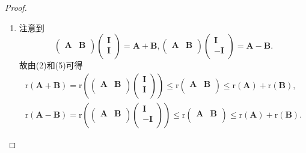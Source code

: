 \documentclass[lang=cn,newtx,10pt,scheme=chinese]{elegantbook}
\begin{document}
\begin{proof}
\begin{enumerate}[(1)]
    \item  注意到
    \[
        \left( \begin{matrix}
            \boldsymbol{A}&		\boldsymbol{B}\\
        \end{matrix} \right) \left( \begin{array}{c}
            \boldsymbol{I}\\
            \boldsymbol{I}\\
        \end{array} \right) =\boldsymbol{A}+\boldsymbol{B},\left( \begin{matrix}
            \boldsymbol{A}&		\boldsymbol{B}\\
        \end{matrix} \right) \left( \begin{array}{c}
            \boldsymbol{I}\\
            -\boldsymbol{I}\\
        \end{array} \right) =\boldsymbol{A}-\boldsymbol{B}.
    \]
    故由(2)和(5)可得
    \begin{align*}
        \mathrm{r}\left( \boldsymbol{A}+\boldsymbol{B} \right) =\mathrm{r}\left( \left( \begin{matrix}
            \boldsymbol{A}&		\boldsymbol{B}\\
        \end{matrix} \right) \left( \begin{array}{c}
            \boldsymbol{I}\\
            \boldsymbol{I}\\
        \end{array} \right) \right) \leqslant \mathrm{r}\left( \begin{matrix}
            \boldsymbol{A}&		\boldsymbol{B}\\
        \end{matrix} \right) \leqslant \mathrm{r}\left( \boldsymbol{A} \right) +\mathrm{r}\left( \boldsymbol{B} \right) ,
        \\
        \mathrm{r}\left( \boldsymbol{A}-\boldsymbol{B} \right) =\mathrm{r}\left( \left( \begin{matrix}
            \boldsymbol{A}&		\boldsymbol{B}\\
        \end{matrix} \right) \left( \begin{array}{c}
            \boldsymbol{I}\\
            -\boldsymbol{I}\\
        \end{array} \right) \right) \leqslant \mathrm{r}\left( \begin{matrix}
            \boldsymbol{A}&		\boldsymbol{B}\\
        \end{matrix} \right) \leqslant \mathrm{r}\left( \boldsymbol{A} \right) +\mathrm{r}\left( \boldsymbol{B} \right) .
    \end{align*}
    

\end{enumerate}
\end{proof}
\end{document}

